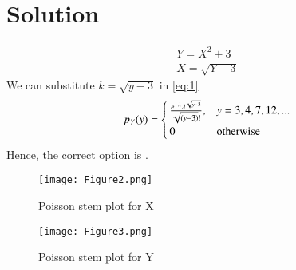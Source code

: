 \documentclass[journal,12pt,twocolumn]{IEEEtran}
\begin{document}
\section*{Solution}
\begin{align}
    Y = X^2 + 3\\
    X = \sqrt{Y - 3}
\end{align}
We can substitute $k = \sqrt{y-3}$ in \eqref{eq:1}
\begin{align}
p_Y(y) = 
    \begin{cases} 
      \frac{e^{-\lambda}\lambda^{\sqrt{y-3}}}{\sqrt{\left(y-3\right)}!}, & y=3,4,7,12,...\\
      0&\text{otherwise}
   \end{cases}
\end{align}
Hence, the correct option is .
\begin{figure}[hb]
    \centering
    \texttt{[image: Figure2.png]}
    \caption{Poisson stem plot for X
     }
    \label{fig:plot}
\end{figure}
\begin{figure}[hb]
    \centering
    \texttt{[image: Figure3.png]}
    \caption{Poisson stem plot for Y
     }
    \label{fig:plot}
\end{figure}
\end{document}
